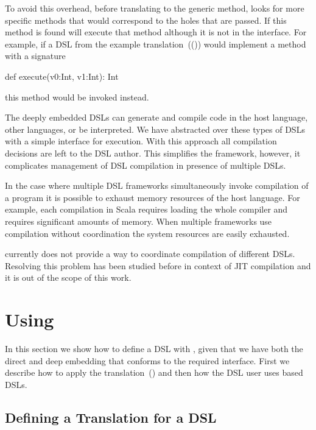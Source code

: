 To avoid this overhead, before translating to the generic  method, \yy looks for
more specific methods that would correspond to the holes that are passed. If this method is found
\yy will execute that method although it is not in the interface. For example, if a DSL from the example
translation~(()) would implement a method with a signature\begin{lstparagraph}
def execute(v0:Int, v1:Int): Int
\end{lstparagraph}
this method would be invoked instead.

The deeply embedded DSLs can generate and compile code in the host language, other languages, or be interpreted. We have
abstracted over these types of DSLs with a simple interface for execution. With this approach
all compilation decisions are left to the DSL author. This simplifies the framework, however, it
complicates management of DSL compilation in presence of multiple DSLs.

In the case where multiple DSL frameworks simultaneously invoke compilation
of a program it is possible to exhaust memory resources of the host language. For example, each
compilation in Scala requires loading the whole compiler and requires significant
amounts of memory. When multiple frameworks use compilation without coordination the
system resources are easily exhausted.

\yy currently does not provide a way to coordinate compilation of different DSLs. Resolving this
 problem has been studied before in context of JIT compilation  and
 it is out of the scope of this work.

\section{Using \yy}
\label{sec:using-yy}

In this section we show how to define a DSL with \yy, given that we have
 both the direct and deep embedding that conforms to the required interface.
 First we describe how to apply the translation~() and
 then how the DSL user uses \yy based DSLs.

\subsection{Defining a Translation for a DSL}
\label{sec:defining-a-translation}

